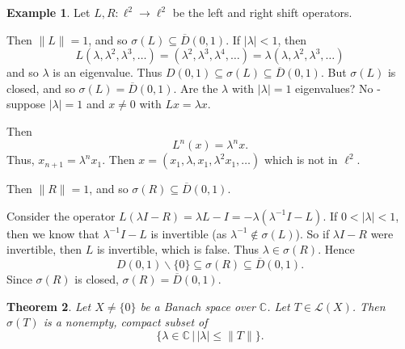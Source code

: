 \documentclass[justified]{tufte-book}
\theoremstyle{plain}%
\newtheorem{thm}{Theorem}[chapter]
\theoremstyle{definition}
\newtheorem{exmp}[thm]{Example}
\theoremstyle{remark}
\newtheorem*{rem}{Remark}
\newcommand{\given}{ \, | \,}
\renewcommand{\C}{\mathbb{C}}
\begin{document}
\begin{exmp}
  Let $L, R : \ell^2 \rightarrow \ell^2$ be the left and right shift operators.  
  
  Then $\| L \| = 1$, and so $\sigma(L) \subseteq \overline D(0,1)$.  If $| \lambda | < 1$, then \[
      L(\lambda, \lambda^2, \lambda^3, \dots) = (\lambda^2, \lambda^3, \lambda^4, \dots) = \lambda(\lambda, \lambda^2, \lambda^3,\dots)
  \] 
  and so $\lambda$ is an eigenvalue.  Thus $D(0,1) \subseteq \sigma(L) \subseteq \overline D(0,1)$.  But $\sigma(L)$ is closed, and so $\sigma(L) = \overline D(0,1)$.  Are the $\lambda$ with $| \lambda | = 1$ eigenvalues?  No - suppose $| \lambda | = 1$ and $x \neq 0$ with $Lx = \lambda x$.  
  
  Then \[
      L^n (x) = \lambda^n x.  
  \]  Thus, $x_{n+1} = \lambda^n x_1$.  Then $x = (x_1, \lambda, x_1, \lambda^2 x_1, \dots)$ which is not in $\ell^2$.
  
  Then $\| R \| = 1$, and so $\sigma(R) \subseteq \overline D(0,1)$.
  
  Consider the operator $L(\lambda I - R) = \lambda L - I = -\lambda(\lambda^{-1} I - L)$.  If $0 < | \lambda | < 1$, then we know that $\lambda^{-1}I - L$ is invertible (as $\lambda^{-1} \notin \sigma(L)$).  So if $\lambda I - R$ were invertible, then $L$ is invertible, which is false. Thus $\lambda \in \sigma(R)$. Hence \[
      D(0,1) \backslash \{ 0 \} \subseteq \sigma(R) \subseteq \overline D(0,1).  
  \]  Since $\sigma(R)$ is closed, $\sigma(R) = \overline D(0,1)$. 
\end{exmp} 

\begin{thm}
  Let $X \neq \{ 0 \}$ be a Banach space over $\C$.  Let $T \in \mathcal L(X)$.  Then $\sigma(T)$ is a nonempty, compact subset of \[
      \{ \lambda \in \C \given | \lambda | \leq \| T \| \}.
  \]
\end{thm}
\end{document}
